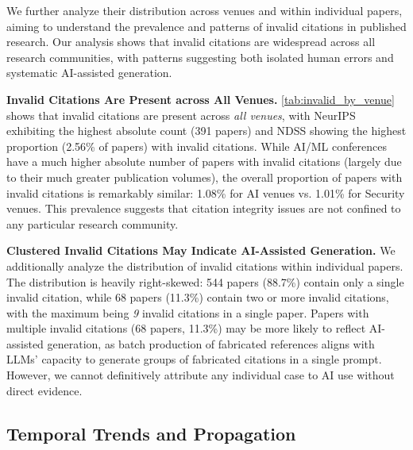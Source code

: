 We further analyze their distribution across venues and within individual papers, aiming to understand the prevalence and patterns of invalid citations in published research.
Our analysis shows that invalid citations are widespread across all research communities, with patterns suggesting both isolated human errors and systematic AI-assisted generation.



\noindent\textbf{Invalid Citations Are Present across All Venues.}
\cref{tab:invalid_by_venue} shows that invalid citations are present across \textit{all venues}, with NeurIPS exhibiting the highest absolute count (391 papers) and NDSS showing the highest proportion (2.56\% of papers) with invalid citations. 
While AI/ML conferences have a much higher absolute number of papers with invalid citations (largely due to their much greater publication volumes), the overall proportion of papers with invalid citations is remarkably similar: 1.08\% for AI venues vs. 1.01\% for Security venues. 
This prevalence suggests that citation integrity issues are not confined to any particular research community.

\noindent
\textbf{Clustered Invalid Citations May Indicate AI-Assisted Generation.}
We additionally analyze the distribution of invalid citations within individual papers.
The distribution is heavily right-skewed: 544 papers (88.7\%) contain only a single invalid citation, while 68 papers (11.3\%) contain two or more invalid citations, with the maximum being \textit{9} invalid citations in a single paper.
Papers with multiple invalid citations (68 papers, 11.3\%) may be more likely to reflect AI-assisted generation, as batch production of fabricated references aligns with LLMs' capacity to generate groups of fabricated citations in a single prompt. However, we cannot definitively attribute any individual case to AI use without direct evidence.


\subsection{Temporal Trends and Propagation}

